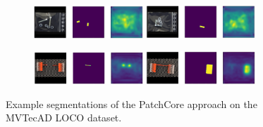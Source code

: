 \begin{figure}[H]
\begin{subfigure}[b]{\textwidth}
    \end{subfigure}
    \begin{subfigure}[b]{\textwidth}
        \centering
        \includegraphics[width=0.45\textwidth]{figures/appendix/appendix_patchcore/SB/screw_bag_test_logical_anomalies_001.png}
        \includegraphics[width=0.45\textwidth]{figures/appendix/appendix_patchcore/SB/screw_bag_test_logical_anomalies_097.png}

    \end{subfigure}
    \begin{subfigure}[b]{\textwidth}
        \centering
        \includegraphics[width=0.45\textwidth]{figures/appendix/appendix_patchcore/SC/splicing_connectors_test_logical_anomalies_003.png}
        \includegraphics[width=0.45\textwidth]{figures/appendix/appendix_patchcore/SC/splicing_connectors_test_structural_anomalies_058.png}

    \end{subfigure}
    
    \caption{Example segmentations of the PatchCore \cite{patchCore2022} approach on the MVTecAD LOCO \cite{LOCODentsAndScratchesBergmann2022} dataset.}
    \label{fig:appendixpatchcore}
\end{figure}